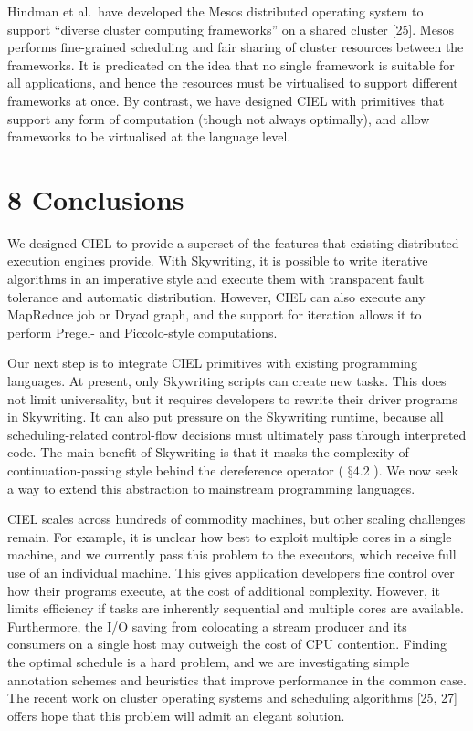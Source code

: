 \documentclass[
]{article}
\begin{document}
Hindman et al.~have developed the Mesos distributed operating system to
support ``diverse cluster computing frameworks'' on a shared cluster
{[}25{]}. Mesos performs fine-grained scheduling and fair sharing of
cluster resources between the frameworks. It is predicated on the idea
that no single framework is suitable for all applications, and hence the
resources must be virtualised to support different frameworks at once.
By contrast, we have designed CIEL with primitives that support any form
of computation (though not always optimally), and allow frameworks to be
virtualised at the language level.

\section{8 Conclusions}\label{conclusions}

We designed CIEL to provide a superset of the features that existing
distributed execution engines provide. With Skywriting, it is possible
to write iterative algorithms in an imperative style and execute them
with transparent fault tolerance and automatic distribution. However,
CIEL can also execute any MapReduce job or Dryad graph, and the support
for iteration allows it to perform Pregel- and Piccolo-style
computations.

Our next step is to integrate CIEL primitives with existing programming
languages. At present, only Skywriting scripts can create new tasks.
This does not limit universality, but it requires developers to rewrite
their driver programs in Skywriting. It can also put pressure on the
Skywriting runtime, because all scheduling-related control-flow
decisions must ultimately pass through interpreted code. The main
benefit of Skywriting is that it masks the complexity of
continuation-passing style behind the dereference operator ( \(§4.2\) ).
We now seek a way to extend this abstraction to mainstream programming
languages.

CIEL scales across hundreds of commodity machines, but other scaling
challenges remain. For example, it is unclear how best to exploit
multiple cores in a single machine, and we currently pass this problem
to the executors, which receive full use of an individual machine. This
gives application developers fine control over how their programs
execute, at the cost of additional complexity. However, it limits
efficiency if tasks are inherently sequential and multiple cores are
available. Furthermore, the I/O saving from colocating a stream producer
and its consumers on a single host may outweigh the cost of CPU
contention. Finding the optimal schedule is a hard problem, and we are
investigating simple annotation schemes and heuristics that improve
performance in the common case. The recent work on cluster operating
systems and scheduling algorithms {[}25, 27{]} offers hope that this
problem will admit an elegant solution.
\end{document}
